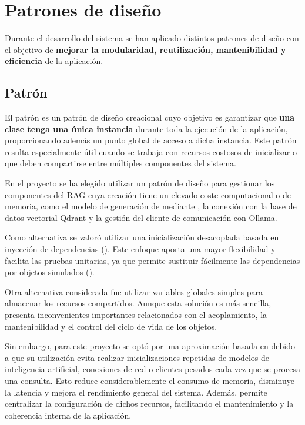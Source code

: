 \section{Patrones de diseño}

Durante el desarrollo del sistema se han aplicado distintos patrones de diseño  con el objetivo de \textbf{mejorar la modularidad, reutilización, mantenibilidad y eficiencia} de la aplicación.

\subsection{Patrón }

El patrón  es un patrón de diseño creacional cuyo objetivo es garantizar que \textbf{una clase tenga una única instancia} durante toda la ejecución de la aplicación, proporcionando además un punto global de acceso a dicha instancia. Este patrón resulta especialmente útil cuando se trabaja con recursos costosos de inicializar o que deben compartirse entre múltiples componentes del sistema.

En el proyecto se ha elegido utilizar un patrón de diseño  para gestionar los componentes del RAG cuya creación tiene un elevado coste computacional o de memoria, como el modelo de generación de  mediante , la conexión con la base de datos vectorial Qdrant y la gestión del cliente de comunicación con Ollama.

Como alternativa se valoró utilizar una inicialización desacoplada basada en inyección de dependencias (). Este enfoque aporta una mayor flexibilidad y facilita las pruebas unitarias, ya que permite sustituir fácilmente las dependencias por objetos simulados (). 

Otra alternativa considerada fue utilizar variables globales simples para almacenar los recursos compartidos. Aunque esta solución es más sencilla, presenta inconvenientes importantes relacionados con el acoplamiento, la mantenibilidad y el control del ciclo de vida de los objetos.

Sin embargo, para este proyecto se optó por una aproximación basada en  debido a que su utilización evita realizar inicializaciones repetidas de modelos de inteligencia artificial, conexiones de red o clientes pesados cada vez que se procesa una consulta. Esto reduce considerablemente el consumo de memoria, disminuye la latencia y mejora el rendimiento general del sistema. Además, permite centralizar la configuración de dichos recursos, facilitando el mantenimiento y la coherencia interna de la aplicación.

